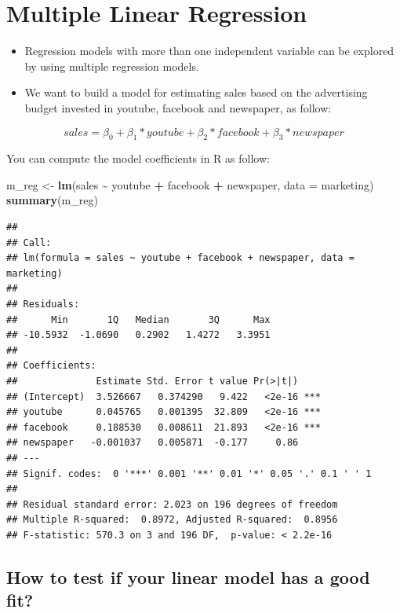 \documentclass[
]{book}
\newenvironment{Shaded}{\begin{snugshade}}{\end{snugshade}}
\newcommand{\AttributeTok}[1]{\textcolor[rgb]{0.13,0.29,0.53}{#1}}
\newcommand{\FunctionTok}[1]{\textcolor[rgb]{0.13,0.29,0.53}{\textbf{#1}}}
\newcommand{\NormalTok}[1]{#1}
\newcommand{\OtherTok}[1]{\textcolor[rgb]{0.56,0.35,0.01}{#1}}
\newcommand{\SpecialCharTok}[1]{\textcolor[rgb]{0.81,0.36,0.00}{\textbf{#1}}}
\begin{document}
\hypertarget{multiple-linear-regression}{%
\section{Multiple Linear Regression}\label{multiple-linear-regression}}

\begin{itemize}
\item
  Regression models with more than one independent variable can be explored by using multiple regression models.
\item
  We want to build a model for estimating sales based on the advertising budget invested in youtube, facebook and newspaper, as follow:
\end{itemize}

\[sales = \beta_0 + \beta_1*youtube + \beta_2*facebook + \beta_3*newspaper\]

You can compute the model coefficients in R as follow:

\begin{Shaded}
\begin{Highlighting}[]
\NormalTok{m\_reg }\OtherTok{\textless{}{-}} \FunctionTok{lm}\NormalTok{(sales }\SpecialCharTok{\textasciitilde{}}\NormalTok{ youtube }\SpecialCharTok{+}\NormalTok{ facebook }\SpecialCharTok{+}\NormalTok{ newspaper, }\AttributeTok{data =}\NormalTok{ marketing)}
\FunctionTok{summary}\NormalTok{(m\_reg)}
\end{Highlighting}
\end{Shaded}

\begin{verbatim}
## 
## Call:
## lm(formula = sales ~ youtube + facebook + newspaper, data = marketing)
## 
## Residuals:
##      Min       1Q   Median       3Q      Max 
## -10.5932  -1.0690   0.2902   1.4272   3.3951 
## 
## Coefficients:
##              Estimate Std. Error t value Pr(>|t|)    
## (Intercept)  3.526667   0.374290   9.422   <2e-16 ***
## youtube      0.045765   0.001395  32.809   <2e-16 ***
## facebook     0.188530   0.008611  21.893   <2e-16 ***
## newspaper   -0.001037   0.005871  -0.177     0.86    
## ---
## Signif. codes:  0 '***' 0.001 '**' 0.01 '*' 0.05 '.' 0.1 ' ' 1
## 
## Residual standard error: 2.023 on 196 degrees of freedom
## Multiple R-squared:  0.8972, Adjusted R-squared:  0.8956 
## F-statistic: 570.3 on 3 and 196 DF,  p-value: < 2.2e-16
\end{verbatim}

\hypertarget{how-to-test-if-your-linear-model-has-a-good-fit}{%
\subsection{How to test if your linear model has a good fit?}\label{how-to-test-if-your-linear-model-has-a-good-fit}}
\end{document}
